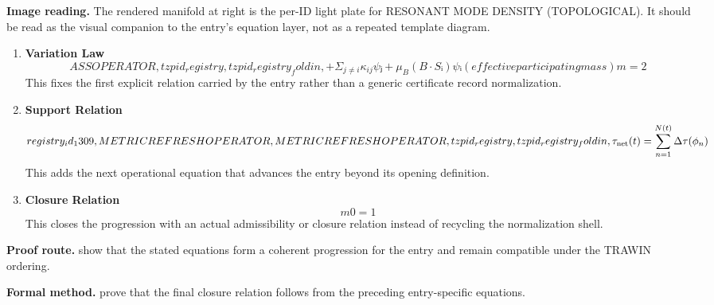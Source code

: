 \begin{samepage}
\noindent\begin{minipage}[t]{0.45\linewidth}
\vspace{0pt}
\raggedright
\scriptsize\textbf{Image reading.} The rendered manifold at right is the per-ID light plate for RESONANT MODE DENSITY (TOPOLOGICAL). It should be read as the visual companion to the entry's equation layer, not as a repeated template diagram.\par
\end{minipage}\hfill
\begin{minipage}[t]{0.53\linewidth}
\vspace*{-0.10in}
\raggedright
{}
\end{minipage}
\end{samepage}

\clearpage


\begin{enumerate}[leftmargin=1.6em,itemsep=9pt,topsep=6pt]
\item \textbf{Variation Law}
\[
ASS OPERATOR,tzpid_registry,tzpid_registry_foldin,+ Σ_{j ≠ i} κ_{ij} ψⱼ + μ_B (B·Sᵢ) ψᵢ (effective participating mass) m = 2
\]
This fixes the first explicit relation carried by the entry rather than a generic certificate record normalization.

\item \textbf{Support Relation}
\[
registry_id_1309,METRIC REFRESH OPERATOR,METRIC REFRESH OPERATOR,tzpid_registry,tzpid_registry_foldin,\tau_{\rm net}(t) = \sum_{n=1}^{N(t)} \Delta \tau(\phi_n)
\]
This adds the next operational equation that advances the entry beyond its opening definition.

\item \textbf{Closure Relation}
\[
m0 = 1
\]
This closes the progression with an actual admissibility or closure relation instead of recycling the normalization shell.
\end{enumerate}

\textbf{Proof route.} show that the stated equations form a coherent progression for the entry and remain compatible under the TRAWIN ordering.

\textbf{Formal method.} prove that the final closure relation follows from the preceding entry-specific equations.

